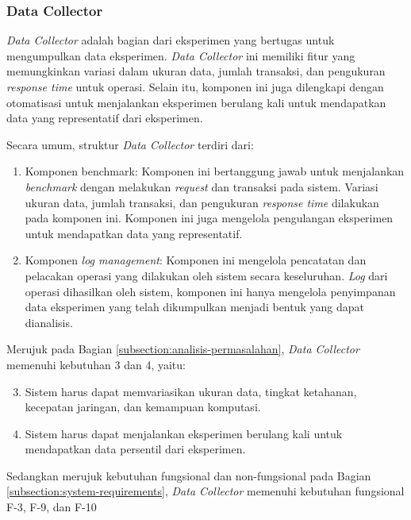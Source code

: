 \subsubsection{Data Collector}
\label{subsubsection:data-collector}

\textit{Data Collector} adalah bagian dari eksperimen yang bertugas untuk mengumpulkan data eksperimen. \textit{Data Collector} ini memiliki fitur yang memungkinkan variasi dalam ukuran data, jumlah transaksi, dan pengukuran \textit{response time} untuk operasi. Selain itu, komponen ini juga dilengkapi dengan otomatisasi untuk menjalankan eksperimen berulang kali untuk mendapatkan data yang representatif dari eksperimen.

Secara umum, struktur \textit{Data Collector} terdiri dari:

\begin{enumerate}
    \item Komponen benchmark: Komponen ini bertanggung jawab untuk menjalankan \textit{benchmark} dengan melakukan \textit{request} dan transaksi pada sistem. Variasi ukuran data, jumlah transaksi, dan pengukuran \textit{response time} dilakukan pada komponen ini. Komponen ini juga mengelola pengulangan eksperimen untuk mendapatkan data yang representatif.
    \item Komponen \textit{log management}: Komponen ini mengelola pencatatan dan pelacakan operasi yang dilakukan oleh sistem secara keseluruhan. \textit{Log} dari operasi dihasilkan oleh sistem, komponen ini hanya mengelola penyimpanan data eksperimen yang telah dikumpulkan menjadi bentuk yang dapat dianalisis.
\end{enumerate}

Merujuk pada Bagian \ref{subsection:analisis-permasalahan}, \textit{Data Collector} memenuhi kebutuhan 3 dan 4, yaitu:

\begin{enumerate}
    \setcounter{enumi}{2}
    \item Sistem harus dapat memvariasikan ukuran data, tingkat ketahanan, kecepatan jaringan, dan kemampuan komputasi.
    \item Sistem harus dapat menjalankan eksperimen berulang kali untuk mendapatkan data persentil dari eksperimen.
\end{enumerate}

Sedangkan merujuk kebutuhan fungsional dan non-fungsional pada Bagian \ref{subsection:system-requirements}, \textit{Data Collector} memenuhi kebutuhan fungsional F-3, F-9, dan F-10
